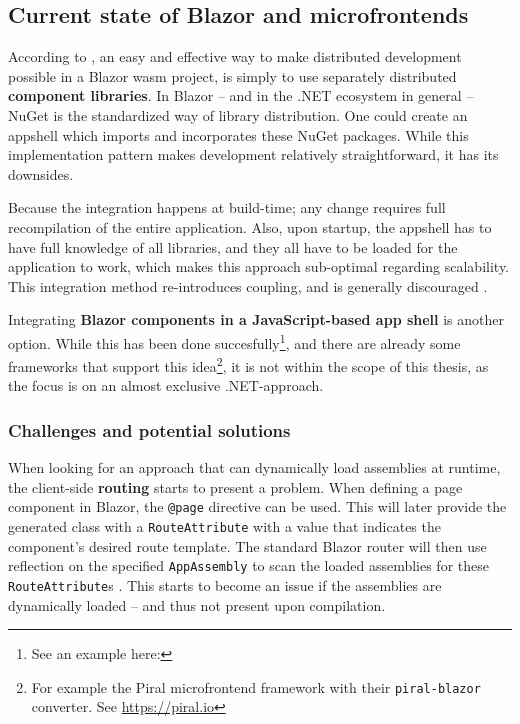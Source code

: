 \subsection{Current state of Blazor and microfrontends}

According to \textcite{Rappl_MunichNETMeetup_2020}, an easy and effective way to
make distributed development possible in a Blazor \gls{wasm} project, is simply
to use separately distributed \textbf{component libraries}. In Blazor -- and in
the .NET ecosystem in general -- NuGet is
the standardized way of library distribution. One could create an \gls{appshell}
which imports and incorporates these NuGet packages. While this implementation
pattern makes development relatively straightforward, it has its downsides.

Because the integration happens at build-time; any change requires full
recompilation of the entire application. Also, upon startup, the \gls{appshell}
has to have full knowledge of all libraries, and they all have to be loaded for
the application to work, which makes this approach sub-optimal regarding
scalability. This integration method re-introduces coupling, and is generally
discouraged \autocite{Jackson_2019}.

Integrating \textbf{Blazor components in a JavaScript-based app shell} is
another option. While this has been done succesfully\footnote{See an example
here: }, and
there are already some frameworks that support this idea\footnote{For example
the Piral \gls{microfrontend} framework with their \texttt{piral-blazor} converter.
See \url{https://piral.io}}, it is not within the scope of this thesis, as the
focus is on an almost exclusive .NET-approach.

\subsubsection{Challenges and potential solutions}

When looking for an approach that can dynamically load assemblies at runtime,
the client-side \textbf{routing} starts to present a problem. When defining a
page component in Blazor, the \texttt{@page} directive can be used. This will
later provide the generated class with a \texttt{RouteAttribute} with a value
that indicates the component's desired route template. The standard Blazor
router will then use reflection on the specified \texttt{AppAssembly} to scan the
loaded assemblies for these \texttt{RouteAttribute}s \autocite{Sainty_2019}.
This starts to become an issue if the assemblies are dynamically loaded -- and
thus not present upon compilation. 

